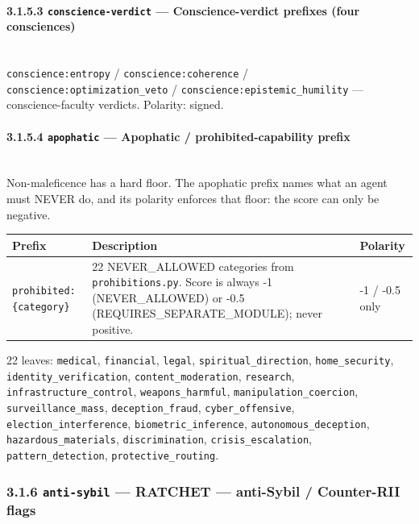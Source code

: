 \documentclass[11pt]{article}
\begin{document}
\paragraph{3.1.5.3 \texttt{conscience-verdict} — Conscience-verdict prefixes (four consciences)}\mbox{}\\


\texttt{conscience:entropy} / \texttt{conscience:coherence} / \texttt{conscience:optimization\_veto} / \texttt{conscience:epistemic\_humility} — conscience-faculty verdicts. Polarity: signed.


\paragraph{3.1.5.4 \texttt{apophatic} — Apophatic / prohibited-capability prefix}\mbox{}\\


Non-maleficence has a hard floor. The apophatic prefix names what an agent must NEVER do, and its polarity enforces that floor: the score can only be negative.


{\footnotesize
\begin{longtable}{|p{5.33cm}|p{5.33cm}|p{5.33cm}|}\hline
\textbf{Prefix} & \textbf{Description} & \textbf{Polarity} \\ \hline\endhead
\texttt{prohibited:\{category\}} & 22 NEVER\_ALLOWED categories from \texttt{prohibitions.py}. Score is always -1 (NEVER\_ALLOWED) or -0.5 (REQUIRES\_SEPARATE\_MODULE); never positive. & -1 / -0.5 only \\ \hline
\end{longtable}}


22 leaves: \texttt{medical}, \texttt{financial}, \texttt{legal}, \texttt{spiritual\_direction}, \texttt{home\_security}, \texttt{identity\_verification}, \texttt{content\_moderation}, \texttt{research}, \texttt{infrastructure\_control}, \texttt{weapons\_harmful}, \texttt{manipulation\_coercion}, \texttt{surveillance\_mass}, \texttt{deception\_fraud}, \texttt{cyber\_offensive}, \texttt{election\_interference}, \texttt{biometric\_inference}, \texttt{autonomous\_deception}, \texttt{hazardous\_materials}, \texttt{discrimination}, \texttt{crisis\_escalation}, \texttt{pattern\_detection}, \texttt{protective\_routing}.


\subsubsection*{3.1.6 \texttt{anti-sybil} — RATCHET — anti-Sybil / Counter-RII flags}
\end{document}
